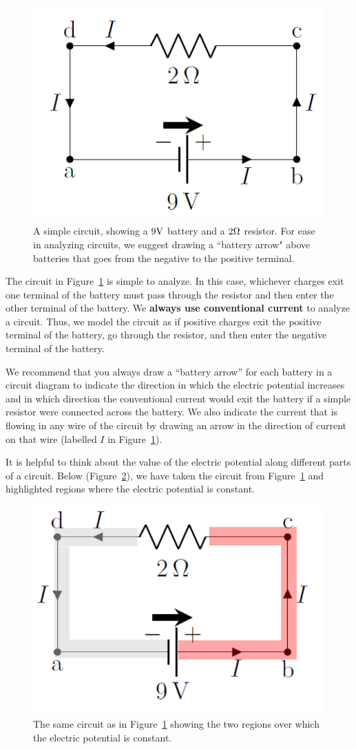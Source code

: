 \begin{figure}[!htbp]
\centering
\includegraphics[width=0.35\linewidth]{files/batteryresistor-2b2416149cc3b585879ef82a83e4ac22.png}
\caption[]{A simple circuit, showing a $9 {\rm V}$ battery and a $2 {\rm \Omega}$ resistor. For ease in analyzing circuits, we suggest drawing a ``battery arrow" above batteries that goes from the negative to the positive terminal.}
\label{fig:circuits:batteryresistor}
\end{figure}

The circuit in Figure~\ref{fig:circuits:batteryresistor} is simple to analyze. In this case, whichever charges exit one terminal of the battery must pass through the resistor and then enter the other terminal of the battery. We \textbf{always use conventional current} to analyze a circuit. Thus, we model the circuit as if positive charges exit the positive terminal of the battery, go through the resistor, and then enter the negative terminal of the battery.

We recommend that you always draw a ``battery arrow'' for each battery in a circuit diagram to indicate the direction in which the electric potential increases and in which direction the conventional current would exit the battery if a simple resistor were connected across the battery. We also indicate the current that is flowing in any wire of the circuit by drawing an arrow in the direction of current on that wire (labelled $I$ in Figure~\ref{fig:circuits:batteryresistor}).


It is helpful to think about the value of the electric potential along different parts of a circuit. Below (Figure~\ref{fig:circuits:batteryresistor_colour}), we have taken the circuit from Figure~\ref{fig:circuits:batteryresistor} and highlighted regions where the electric potential is constant.

\begin{figure}[!htbp]
\centering
\includegraphics[width=0.4\linewidth]{files/batteryresistor_colo-947aa7e3376cf4c2c40889a8b3e04443.png}
\caption[]{The same circuit as in Figure~\ref{fig:circuits:batteryresistor} showing the two regions over which the electric potential is constant.}
\label{fig:circuits:batteryresistor_colour}
\end{figure}

